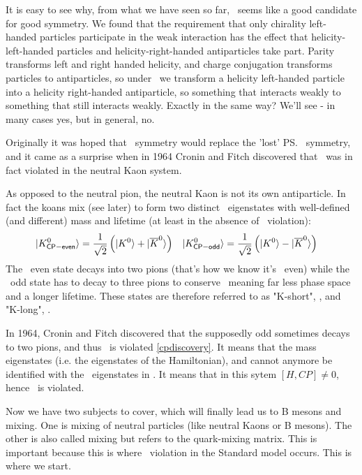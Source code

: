 It is easy to see why, from what we have seen so far, \cp\ seems like a
 good candidate for good symmetry. We found that the requirement that
 only chirality left-handed particles participate in the weak
 interaction has the effect that helicity-left-handed particles
 and helicity-right-handed antiparticles take part. Parity
 transforms left and right handed helicity, and charge conjugation
 transforms particles to antiparticles, so under \cp\ we transform a
 helicity left-handed particle into a helicity right-handed
 antiparticle, so something that interacts weakly to something that
 still interacts weakly. Exactly in the same way? We'll see - in many
 cases yes, but in general, no.


 Originally it was hoped that \cp\ symmetry would replace the 'lost'
 \ps\ symmetry, and it came as a surprise when in 1964 Cronin and Fitch
 discovered that \cp\ was in fact violated in the neutral Kaon
 system\cite{cpdiscovery}.

 As opposed to the neutral pion, the neutral Kaon is not its own
 antiparticle. In fact the koans mix (see later) to form two distinct
 \cp\ eigenstates with well-defined (and different) mass and lifetime (at least in the absence of \cp\ violation):
 \begin{align}
 \label{eq:KaonCPevenOdd}
   | K^0_{\mathsf{CP-even}} \rangle &= \frac{1}{\sqrt{2}}\left( | K^0 \rangle +  | \overline{K}^0 \rangle\right)
   &
   | K^0_{\mathsf{CP-odd}} \rangle &= \frac{1}{\sqrt{2}}\left( | K^0 \rangle -  | \overline{K}^0 \rangle  \right)
 \end{align}
 The \cp\ even state decays into two pions (that's how we know it's \cp\ even) while the \cp\ odd state has to decay to three pions to conserve \cp\, meaning far less phase space and a longer lifetime.
 These states are therefore referred to as "K-short", , 
 and "K-long", .

 In 1964, Cronin and Fitch discovered that the supposedly \cp\-odd
  sometimes decays to two pions, and thus \cp\ is violated
 \ref{cpdiscovery}. 
 It means that the mass eigenstates (i.e. the eigenstates of the Hamiltonian), 
  and  
 cannot anymore be identified with the \cp\ eigenstates in . 
 It means that in this sytem $[H,CP] \neq 0$, hence \cp\ is violated.

 Now we have two subjects to cover, which will finally lead us to B
 mesons and mixing. One is mixing of neutral particles (like neutral
 Kaons or B mesons). The other is also called mixing but refers to the
 quark-mixing matrix. This is important because this is where \cp\
 violation in the Standard model occurs. This is where we
 start.


